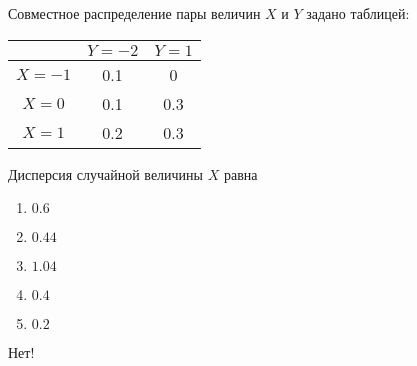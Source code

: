 \documentclass[t]{beamer}
\begin{document}
 \begin{frame} \label{15-No} 
\begin{block}{15} 

Совместное распределение пары величин $X$ и $Y$ задано таблицей:

\begin{center}
\begin{tabular}{c|cc}
 & $Y=-2$ & $Y=1$ \\
\hline
$X=-1$ & 0.1 & 0 \\
$X=0$ & 0.1 & 0.3 \\
$X=1$ & 0.2 & 0.3 \\
\end{tabular}
\end{center}
\vspace{0.2cm} 
 
 Дисперсия случайной величины $X$ равна
 


 \end{block} 
\begin{enumerate} 
\item[] \hyperlink{15-No}{\beamergotobutton{} $0.6$}
\item[] \hyperlink{15-Yes}{\beamergotobutton{} $0.44$}
\item[] \hyperlink{15-No}{\beamergotobutton{} $1.04$
}
\item[] \hyperlink{15-No}{\beamergotobutton{} $0.4$}
\item[] \hyperlink{15-No}{\beamergotobutton{} $0.2$}
\end{enumerate} 

 \alert{Нет!} 
\end{frame} 
\end{document}
